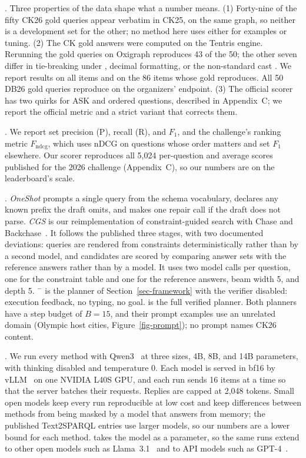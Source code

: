 .
Three properties of the data shape what a number means.
(1) Forty-nine of the fifty CK26 gold queries appear verbatim in CK25, on
the same graph, so neither is a development set for the other; no
method here uses either for examples or tuning.
(2) The CK gold answers were computed on the Tentris engine.
Rerunning the gold queries on Oxigraph reproduces 43 of the 50; the
other seven differ in tie-breaking under , decimal formatting,
or the non-standard cast .
We report results on all items and on the 86 items whose gold
reproduces.
All 50 DB26 gold queries reproduce on the organizers' endpoint.
(3) The official scorer has two quirks for ASK and ordered questions,
described in Appendix~C; we report the official metric and a strict
variant that corrects them.

.
We report set precision (P), recall (R), and $F_1$, and the challenge's
ranking metric $F_{\mathrm{ndcg}}$, which uses nDCG on questions whose
order matters and set $F_1$ elsewhere.
Our scorer reproduces all 5,024 per-question and average scores
published for the 2026 challenge (Appendix~C), so our numbers are on
the leaderboard's scale.

.
\emph{OneShot} prompts a single query from the schema vocabulary,
declares any known prefix the draft omits, and makes one repair call if
the draft does not parse.
\emph{CGS} is our reimplementation of constraint-guided search with
Chase and Backchase~\cite{wang2026uniqgen}.
It follows the published three stages, with two documented deviations:
queries are rendered from constraints deterministically rather than by
a second model, and candidates are scored by comparing answer sets with
the reference answers rather than by a model.
It uses two model calls per question, one for the constraint table and
one for the reference answers, beam width 5, and depth 5.
\emph{\hermes{}$^-$} is the planner of Section~\ref{sec-framework} with
the verifier disabled: execution feedback, no typing, no goal.
\emph{\hermes} is the full verified planner.
Both planners have a step budget of $B = 15$, and their prompt examples
use an unrelated domain (Olympic host cities, Figure~\ref{fig-prompt});
no prompt names CK26 content.

.
We run every method with Qwen3~\cite{yang2025qwen3} at three sizes,
4B, 8B, and 14B parameters, with thinking disabled and temperature 0.
Each model is served in bf16 by vLLM~\cite{kwon2023vllm} on one NVIDIA
L40S GPU, and each run sends 16 items at a time so that the server
batches their requests.
Replies are capped at 2,048 tokens.
Small open models keep every run reproducible at low cost and keep
differences between methods from being masked by a model that answers
from memory; the published Text2SPARQL entries use larger models, so
our numbers are a lower bound for each method.
\hermes takes the model as a parameter, so the same runs extend to other
open models such as Llama~3.1~\cite{grattafiori2024llama3} and to API
models such as GPT-4~\cite{openai2023gpt4}.

